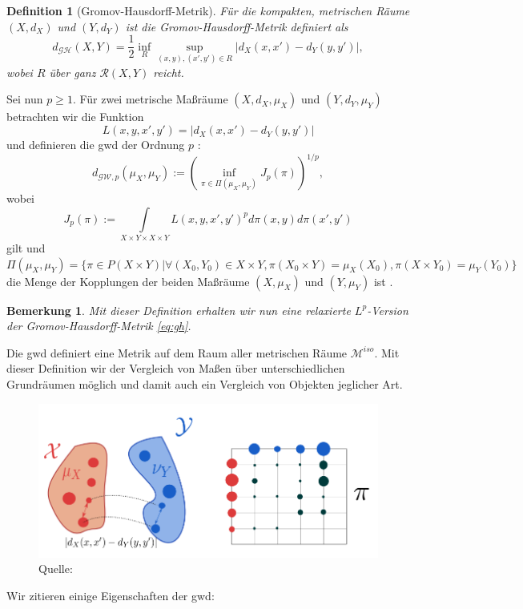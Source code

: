 \documentclass[twoside, 12pt,a4paper]{book}
\newcommand{\source}[1]{\caption*{\hfill Quelle: {#1}} }
\def\emph#1{\textit{#1}}
\newtheorem{definition}[theorem]{Definition}
\newtheorem{remark}[theorem]{Bemerkung}
\numberwithin{equation}{section}
\begin{document}
	\begin{definition}[Gromov-Hausdorff-Metrik]
		Für die kompakten, metrischen Räume $(X,d_X)$ und $(Y,d_Y)$ ist die \emph{Gromov-Hausdorff-Metrik} definiert als
		\begin{equation}
		d_{\mathcal{G}\mathcal{H}}(X,Y) = \frac{1}{2}\inf_{R} \sup_{(x,y),(x',y') \in R}{|d_X(x,x')- d_Y(y,y')|}, \label{eq:gh}
		\end{equation}
		wobei $R$ über ganz $\mathcal{R}(X,Y)$ reicht.
	\end{definition}
	
	\noindent Sei nun $p\geq 1$. Für zwei metrische Maßräume $(X,d_X,\mu_X)$ und $(Y,d_Y,\mu_Y)$ betrachten wir die Funktion 
	\begin{equation}
	L(x,y,x',y') = |d_X(x,x') - d_Y(y,y')|
	\end{equation}
	und definieren die \ac{gwd} der Ordnung $p$ \cite{memoli2011gromov}:
	\begin{equation}
	d_{\mathcal{GW},p}(\mu_X,\mu_Y):=\left(\inf_{\pi \in \Pi(\mu_X, \mu_Y)} {J_p(\pi)}\right)^{1/p},
	\end{equation}
	wobei
	\begin{equation}
	J_p(\pi) := \int\limits_{X\times Y \times  X\times Y}{L(x,y,x',y')^pd\pi(x,y)d\pi(x',y')}
	\end{equation}
	gilt und $\Pi(\mu_X,\mu_Y) = \lbrace \pi \in P(X\times Y) | \forall (X_0,Y_0) \in X \times Y, \pi (X_0 \times Y) = \mu_X (X_0), \pi(X \times Y_0) = \mu_Y(Y_0) \rbrace$
	die Menge der Kopplungen der beiden Maßräume $(X,\mu_X)$ und $(Y,\mu_Y)$ ist \cite{villani2003topics,vayer2020fused}.
	\begin{remark}
		Mit dieser Definition erhalten wir nun eine relaxierte $L^p$-Version der Gromov-Hausdorff-Metrik \eqref{eq:gh}.
	\end{remark}
	\noindent Die \ac{gwd} definiert eine Metrik auf dem Raum aller metrischen Räume $\mathcal{M}^{iso}$. 
	Mit dieser Definition wir der Vergleich von Maßen über unterschiedlichen Grundräumen möglich und damit auch ein Vergleich von Objekten jeglicher Art.
	
	\begin{figure}[h!]
		\begin{center}
			\includegraphics[width=0.3\textheight]{gwd_Transportplan.png}
			\caption[Beispiel der \acl{gwd}]{\textbf{Links:} Die beiden metrischen Maßräume $\mathcal{X}$ und $\mathcal{Y}$. \textbf{Rechts:} Zugehöriger Transportplan}
			\source{\cite{vayer2020fused}}
		\end{center}
	\end{figure}
	\newpage
	\noindent Wir zitieren einige Eigenschaften der \ac{gwd}:
	
\end{document}
